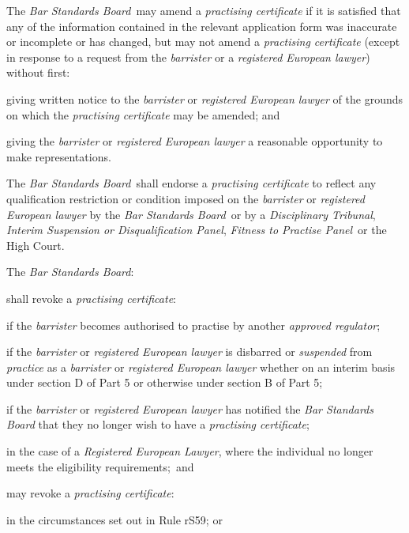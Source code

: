The \emph{Bar Standards Board}~may amend a \emph{practising certificate}
if it is satisfied that any of the information contained in the relevant
application form was inaccurate or incomplete or has changed, but may
not amend a \emph{practising certificate} (except in response to a
request from the \emph{barrister} or a \emph{registered European
lawyer}) without first:\nl\item giving written notice to the \emph{barrister} or \emph{registered
European lawyer} of the grounds on which the \emph{practising
certificate} may be amended; and
\item giving the \emph{barrister} or \emph{registered European lawyer} a
reasonable opportunity to make representations.
\ln
{}

The \emph{Bar Standards Board}~shall endorse a \emph{practising
certificate} to reflect any qualification restriction or condition
imposed on the \emph{barrister} or \emph{registered European lawyer} by
the \emph{Bar Standards Board}~or by a \emph{Disciplinary Tribunal},
\emph{Interim Suspension or Disqualification Panel}, \emph{Fitness to
Practise Panel}~or the High Court.


The \emph{Bar Standards Board}:\nl\item shall revoke a \emph{practising certificate}:
\al
\item if the \emph{barrister} becomes authorised to practise by another
\emph{approved regulator};

\item if the \emph{barrister} or \emph{registered European lawyer} is
disbarred or \emph{suspended} from \emph{practice} as a \emph{barrister}
or \emph{registered European lawyer} whether on an interim basis under
section D of Part 5 or otherwise under section B of Part 5;

\item if the \emph{barrister} or \emph{registered European lawyer} has
notified the \emph{Bar Standards Board} that they no longer wish to have
a \emph{practising certificate};

\item in the case of a \emph{Registered European Lawyer}, where the
individual no longer meets the eligibility requirements;~and\la
\item may revoke a \emph{practising certificate}:
\al
\item in the circumstances set out in Rule rS59; or

